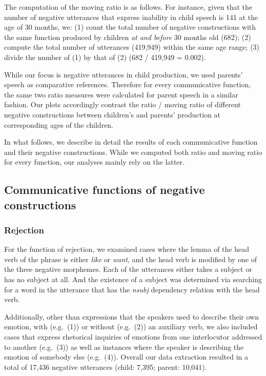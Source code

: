 \documentclass[10pt, letterpaper]{article}
\begin{document}
The computation of the moving ratio is as follows. For instance, given
that the number of negative utterances that express inability in child
speech is 141 at the age of 30 months, we: (1) count the total number of
negative constructions with the same function produced by children
\emph{at and before} 30 months old (682); (2) compute the total number
of utterances (419,949) within the same age range; (3) divide the number
of (1) by that of (2) (682 / 419,949 = 0.002).

While our focus is negative utterances in child production, we used
parents' speech as comparative references. Therefore for every
communicative function, the same two ratio measures were calculated for
parent speech in a similar fashion. Our plots accordingly contrast the
ratio / moving ratio of different negative constructions between
children's and parents' production at corresponding ages of the
children.

In what follows, we describe in detail the results of each communicative
function and their negative constructions. While we computed both ratio
and moving ratio for every function, our analyses mainly rely on the
latter.

\hypertarget{communicative-functions-of-negative-constructions}{%
\subsection{Communicative functions of negative
constructions}\label{communicative-functions-of-negative-constructions}}

\hypertarget{rejection}{%
\subsubsection{Rejection}\label{rejection}}

For the function of rejection, we examined cases where the lemma of the
head verb of the phrase is either \emph{like} or \emph{want}, and the
head verb is modified by one of the three negative morphemes. Each of
the utterances either takes a subject or has no subject at all. And the
existence of a subject was determined via searching for a word in the
utterance that has the \emph{nsubj} dependency relation with the head
verb.

Additionally, other than expressions that the speakers used to describe
their own emotion, with (e.g.~(1)) or without (e.g.~(2)) an auxiliary
verb, we also included cases that express rhetorical inquiries of
emotions from one interlocutor addressed to another (e.g.~(3)) as well
as instances where the speaker is describing the emotion of somebody
else (e.g.~(4)). Overall our data extraction resulted in a total of
17,436 negative utterances (child: 7,395; parent: 10,041).
\end{document}
